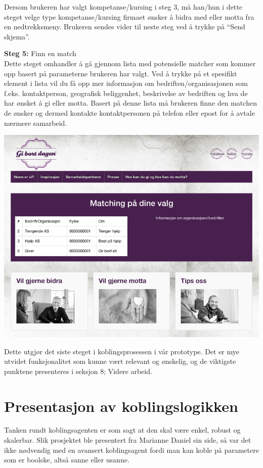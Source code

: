 Dersom brukeren har valgt kompetanse/kursing i steg 3, må han/hun i dette steget velge type kompetanse/kursing firmaet ønsker å bidra med eller motta fra en nedtrekksmeny. Brukeren sendes vider til neste steg ved å trykke på ``Send skjema''.\\

\newpage

{\bf Steg 5:} Finn en match\\
Dette steget omhandler å gå gjennom lista med potensielle matcher som kommer opp basert på parameterne brukeren har valgt. Ved å trykke på et spesifikt element i lista vil du få opp mer informasjon om bedriften/organisasjonen som f.eks. kontaktperson, geografisk beliggenhet, beskrivelse av bedriften og hva de har ønsket å gi eller motta. Basert på denne lista må brukeren finne den matchen de ønsker og dermed kontakte kontaktpersonen på telefon eller epost for å avtale nærmere samarbeid.\\
\begin{center}
\includegraphics[clip=true, width=1 \textwidth,
trim=0cm 0cm 0cm 0cm]{match.png}
\label{fig:match}
\end{center}

Dette utgjør det siste steget i koblingsprosessen i vår prototype. Det er mye utvidet funksjonalitet som kunne vært relevant og ønskelig, og de viktigste punktene presenteres i seksjon 8; Videre arbeid.\\

\section{Presentasjon av koblingslogikken}
Tanken rundt koblingsagenten er som sagt at den skal være enkel, robust og skalerbar. Slik prosjektet ble presentert fra Marianne Daniel sin side, så var det ikke nødvendig med en avansert koblingsagent fordi man kan koble på parametere som er boolske, altså sanne eller usanne.\\


